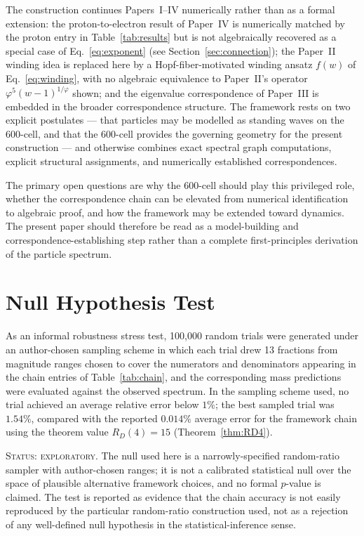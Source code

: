 \documentclass[12pt]{article}
\newcommand{\phig}{\varphi}
\begin{document}
The construction continues Papers~I--IV numerically rather than as a formal extension: the proton-to-electron result of Paper~IV is numerically matched by the proton entry in Table~\ref{tab:results} but is not algebraically recovered as a special case of Eq.~\eqref{eq:exponent} (see Section~\ref{sec:connection}); the Paper~II winding idea is replaced here by a Hopf-fiber-motivated winding ansatz $f(w)$ of Eq.~\eqref{eq:winding}, with no algebraic equivalence to Paper~II's operator $\phig^5(w-1)^{1/\phig}$ shown; and the eigenvalue correspondence of Paper~III is embedded in the broader correspondence structure. The framework rests on two explicit postulates --- that particles may be modelled as standing waves on the 600-cell, and that the 600-cell provides the governing geometry for the present construction --- and otherwise combines exact spectral graph computations, explicit structural assignments, and numerically established correspondences.

The primary open questions are why the 600-cell should play this privileged role, whether the correspondence chain can be elevated from numerical identification to algebraic proof, and how the framework may be extended toward dynamics. The present paper should therefore be read as a model-building and correspondence-establishing step rather than a complete first-principles derivation of the particle spectrum.

\appendix
\section{Null Hypothesis Test}\label{app:null}

As an informal robustness stress test, 100{,}000 random trials were generated under an author-chosen sampling scheme in which each trial drew 13 fractions from magnitude ranges chosen to cover the numerators and denominators appearing in the chain entries of Table~\ref{tab:chain}, and the corresponding mass predictions were evaluated against the observed spectrum. In the sampling scheme used, no trial achieved an average relative error below $1\%$; the best sampled trial was $1.54\%$, compared with the reported $0.014\%$ average error for the framework chain using the theorem value $R_D(4) = 15$ (Theorem~\ref{thm:RD4}).

\textsc{Status: exploratory.} The null used here is a narrowly-specified random-ratio sampler with author-chosen ranges; it is not a calibrated statistical null over the space of plausible alternative framework choices, and no formal $p$-value is claimed. The test is reported as evidence that the chain accuracy is not easily reproduced by the particular random-ratio construction used, not as a rejection of any well-defined null hypothesis in the statistical-inference sense.



\end{document}
